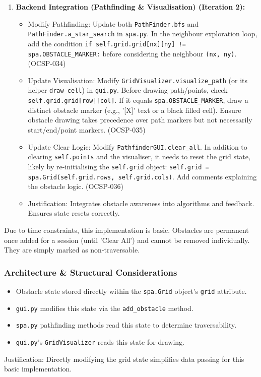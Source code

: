 \begin{enumerate}
\begin{itemize}
	\end{itemize}
	\item \textbf{Backend Integration (Pathfinding \& Visualisation) (Iteration 2):}
	\begin{itemize}
		\item Modify Pathfinding: Update both \verb|PathFinder.bfs| and \verb|PathFinder.a_star_search| in \verb|spa.py|. In the neighbour exploration loop, add the condition \verb|if self.grid.grid[nx][ny] != spa.OBSTACLE_MARKER:| before considering the neighbour \verb|(nx, ny)|. (OCSP-034)
		\item Update Visualisation: Modify \verb|GridVisualizer.visualize_path| (or its helper \verb|draw_cell|) in \verb|gui.py|. Before drawing path/points, check \verb|self.grid.grid[row][col]|. If it equals \verb|spa.OBSTACLE_MARKER|, draw a distinct obstacle marker (e.g., '[X]' text or a black filled cell). Ensure obstacle drawing takes precedence over path markers but not necessarily start/end/point markers. (OCSP-035)
		\item Update Clear Logic: Modify \verb|PathfinderGUI.clear_all|. In addition to clearing \verb|self.points| and the visualiser, it needs to reset the grid state, likely by re-initialising the \verb|self.grid| object: \verb|self.grid = spa.Grid(self.grid.rows, self.grid.cols)|. Add comments explaining the obstacle logic. (OCSP-036)
		\item Justification: Integrates obstacle awareness into algorithms and feedback. Ensures state resets correctly.
	\end{itemize}
\end{enumerate}
Due to time constraints, this implementation is basic. Obstacles are permanent once added for a session (until 'Clear All') and cannot be removed individually. They are simply marked as non-traversable.

\subsubsection{Architecture \& Structural Considerations}
\begin{itemize}
	\item Obstacle state stored directly within the \verb|spa.Grid| object's \verb|grid| attribute.
	\item \verb|gui.py| modifies this state via the \verb|add_obstacle| method.
	\item \verb|spa.py| pathfinding methods read this state to determine traversability.
	\item \verb|gui.py|'s \verb|GridVisualizer| reads this state for drawing.
\end{itemize}
Justification: Directly modifying the grid state simplifies data passing for this basic implementation.

